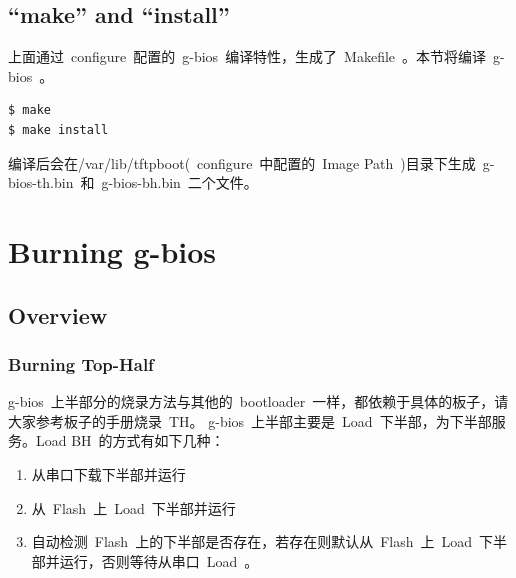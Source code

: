 \documentclass[a4paper,11pt]{book}
\begin{document}
\section{``make'' and ``install''}
上面通过~configure~配置的~g-bios~编译特性，生成了~Makefile~。本节将编译~g-bios~。
\begin{lstlisting}[language=bash,numbers=none]
$ make
$ make install
\end{lstlisting}
编译后会在/var/lib/tftpboot(~configure~中配置的~Image Path~)目录下生成~g-bios-th.bin~和~g-bios-bh.bin~二个文件。

\chapter{Burning g-bios}

\section{Overview}
\subsection{Burning Top-Half}
g-bios~上半部分的烧录方法与其他的~bootloader~一样，都依赖于具体的板子，请大家参考板子的手册烧录~TH。
g-bios~上半部主要是~Load~下半部，为下半部服务。Load BH~的方式有如下几种：
\begin{enumerate} \setlength{\itemsep}{-\itemsep}
\item 从串口下载下半部并运行
\item 从~Flash~上~Load~下半部并运行
\item 自动检测~Flash~上的下半部是否存在，若存在则默认从~Flash~上~Load~下半部并运行，否则等待从串口~Load~。
\end{enumerate}
\end{document}
